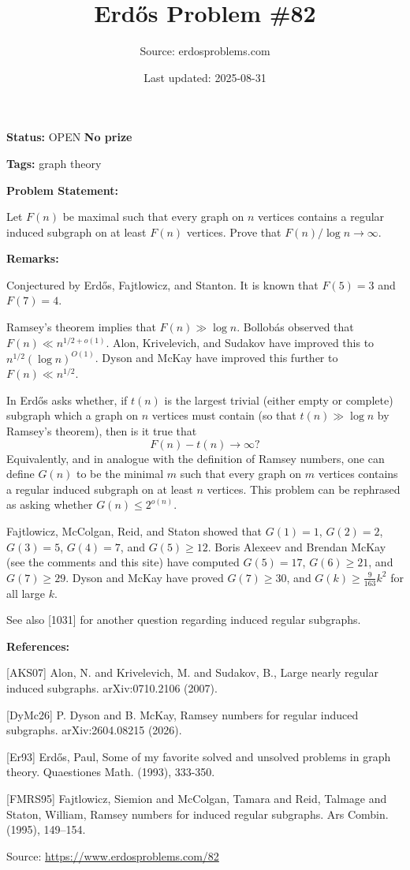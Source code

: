 \documentclass{article}
\title{Erd\H{o}s Problem \#82}
\date{Last updated: 2025-08-31}
\author{Source: erdosproblems.com}
\begin{document}
\maketitle

\noindent\textbf{Status:} OPEN \quad \textbf{No prize}

\noindent\textbf{Tags:} graph theory

\medskip
\noindent\textbf{Problem Statement:}

Let $F(n)$ be maximal such that every graph on $n$ vertices contains a regular induced subgraph on at least $F(n)$ vertices. Prove that $F(n)/\log n\to \infty$.

\bigskip
\noindent\textbf{Remarks:}

Conjectured by Erd\H{o}s, Fajtlowicz, and Stanton. It is known that $F(5)=3$ and $F(7)=4$. 

Ramsey's theorem implies that $F(n)\gg \log n$. Bollob\'{a}s observed that $F(n)\ll n^{1/2+o(1)}$. Alon, Krivelevich, and Sudakov \cite{AKS07} have improved this to $n^{1/2}(\log n)^{O(1)}$. Dyson and McKay \cite{DyMc26} have improved this further to $F(n) \ll n^{1/2}$. 

In \cite{Er93} Erd\H{o}s asks whether, if $t(n)$ is the largest trivial (either empty or complete) subgraph which a graph on $n$ vertices must contain (so that $t(n) \gg \log n$ by Ramsey's theorem), then is it true that\[F(n)-t(n)\to \infty?\]Equivalently, and in analogue with the definition of Ramsey numbers, one can define $G(n)$ to be the minimal $m$ such that every graph on $m$ vertices contains a regular induced subgraph on at least $n$ vertices. This problem can be rephrased as asking whether $G(n) \leq 2^{o(n)}$. 

Fajtlowicz, McColgan, Reid, and Staton \cite{FMRS95} showed that $G(1)=1$, $G(2)=2$, $G(3)=5$, $G(4)=7$, and $G(5)\geq 12$. Boris Alexeev and Brendan McKay (see the comments and this site) have computed $G(5)=17$, $G(6)\geq 21$, and $G(7)\geq 29$. Dyson and McKay \cite{DyMc26} have proved $G(7)\geq 30$, and $G(k)\geq \frac{9}{163}k^2$ for all large $k$.

See also [1031] for another question regarding induced regular subgraphs.

\bigskip
\noindent\textbf{References:}

[AKS07] Alon, N. and Krivelevich, M. and Sudakov, B., Large nearly regular induced subgraphs. arXiv:0710.2106 (2007).
 
 [DyMc26] P. Dyson and B. McKay, Ramsey numbers for regular induced subgraphs. arXiv:2604.08215 (2026).
 
 [Er93] Erd\H{o}s, Paul, Some of my favorite solved and unsolved problems in graph theory. Quaestiones Math. (1993), 333-350.
 
 [FMRS95] Fajtlowicz, Siemion and McColgan, Tamara and Reid, Talmage and
Staton, William, Ramsey numbers for induced regular subgraphs. Ars Combin. (1995), 149--154.

\bigskip
\noindent\small{Source: \url{https://www.erdosproblems.com/82}}
\end{document}
